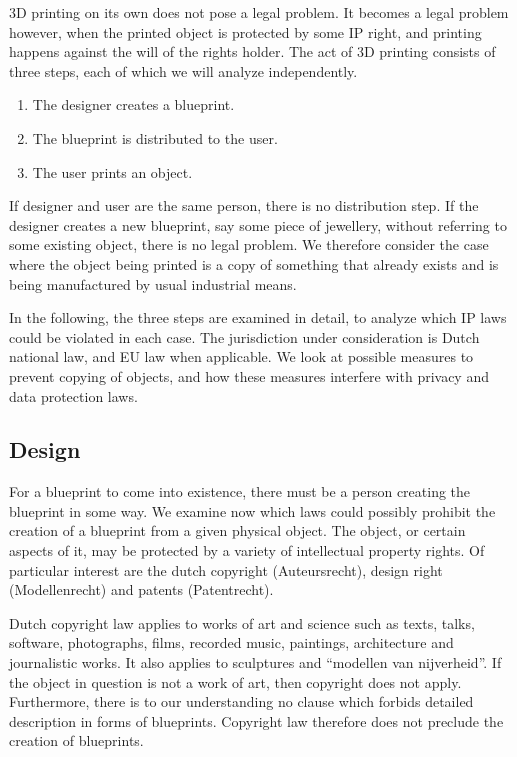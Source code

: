 3D printing on its own does not pose a legal problem.
It becomes a legal problem however, when the printed object is protected by 
some IP right, and printing happens against the will of the rights holder.
The act of 3D printing consists of three steps, each of which we will analyze 
independently.
\begin{enumerate}
  \item The designer creates a blueprint.
  \item The blueprint is distributed to the user.
  \item The user prints an object.
\end{enumerate}

If designer and user are the same person, there is no distribution step.
If the designer creates a new blueprint, say some piece of jewellery, without 
referring to some existing object, there is no legal problem.
We therefore consider the case where the object being printed is a copy of 
something that already exists and is being manufactured by usual industrial 
means.

In the following, the three steps are examined in detail, to analyze which IP 
laws could be violated in each case.
The jurisdiction under consideration is Dutch national law, and EU law when 
applicable.
We look at possible measures to prevent copying of objects, and how these
measures interfere with privacy and data protection laws.

\subsection{Design}
For a blueprint to come into existence, there must be a person creating the blueprint in some way. We examine now which laws could possibly prohibit the creation of a blueprint from a given physical object. The object, or certain aspects of it, may be protected by a variety of intellectual property rights.  Of particular interest are the dutch copyright (Auteursrecht), design right (Modellenrecht) and patents (Patentrecht).

Dutch copyright law applies to works of art and science such as  texts, talks, software, photographs, films, recorded music, paintings, architecture and journalistic works. %
It also applies to sculptures and ``modellen van nijverheid''. If the object in question is not a work of art, then copyright does not apply. Furthermore, there is to our understanding no clause which forbids detailed description in forms of blueprints. Copyright law therefore does not preclude the creation of blueprints.

